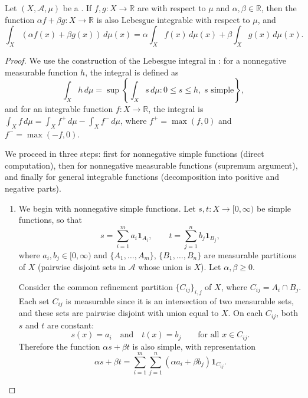 \begin{theorem} \label{theorem:linearity_of_lebesgue_integral}
    Let $(X,\mathcal{A},\mu)$ be a . If $f,g : X \to \mathbb{R}$ are  with respect to $\mu$ and $\alpha,\beta \in \mathbb{R}$, then the function $\alpha f + \beta g : X \to \mathbb{R}$ is also Lebesgue integrable with respect to $\mu$, and
    $$\int_X (\alpha f(x) + \beta g(x))\,d\mu(x) = \alpha \int_X f(x)\,d\mu(x) + \beta \int_X g(x)\,d\mu(x).$$
\end{theorem}

\begin{proof}
We use the construction of the Lebesgue integral in : for a nonnegative measurable function $h$, the integral is defined as $$\int_X h\,d\mu = \sup\left\{\int_X s\,d\mu : 0 \leq s \leq h,\; s \text{ simple}\right\},$$ and for an integrable function $f: X \to \mathbb{R}$, the integral is $\int_X f\,d\mu = \int_X f^+\,d\mu - \int_X f^-\,d\mu$, where $f^+ = \max(f,0)$ and $f^- = \max(-f,0)$.

We proceed in three steps: first for nonnegative simple functions (direct computation), then for nonnegative measurable functions (supremum argument), and finally for general integrable functions (decomposition into positive and negative parts).

\begin{enumerate}
    \item We begin with nonnegative simple functions. Let $s,t : X \to [0,\infty)$ be simple functions, so that $$s = \sum_{i=1}^m a_i \mathbf{1}_{A_i}, \qquad t = \sum_{j=1}^n b_j \mathbf{1}_{B_j},$$ where $a_i,b_j \in [0,\infty)$ and $\{A_1,\dots,A_m\}$, $\{B_1,\dots,B_n\}$ are measurable partitions of $X$ (pairwise disjoint sets in $\mathcal{A}$ whose union is $X$). Let $\alpha,\beta \geq 0$.

    Consider the common refinement partition $\{C_{ij}\}_{i,j}$ of $X$, where $C_{ij} = A_i \cap B_j$. Each set $C_{ij}$ is measurable since it is an intersection of two measurable sets, and these sets are pairwise disjoint with union equal to $X$. On each $C_{ij}$, both $s$ and $t$ are constant: $$s(x) = a_i \quad\text{and}\quad t(x) = b_j \qquad\text{for all } x \in C_{ij}.$$ Therefore the function $\alpha s + \beta t$ is also simple, with representation
    $$\alpha s + \beta t = \sum_{i=1}^m \sum_{j=1}^n (\alpha a_i + \beta b_j) \mathbf{1}_{C_{ij}}.$$


\end{enumerate}
\end{proof}
